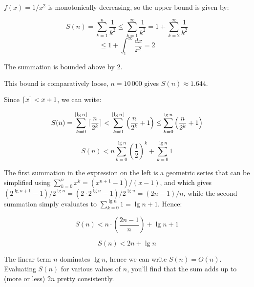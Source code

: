 \documentclass[a4paper,12pt]{article}
\DeclarePairedDelimiter\ceil{\lceil}{\rceil}
\DeclarePairedDelimiter\floor{\lfloor}{\rfloor}
\begin{document}

$f(x) = 1/x^2$ is monotonically decreasing, so the upper bound is given by:

\[ S(n) = \sum_{k=1}^n \frac{1}{k^2} \le \sum_{k=1}^\infty \frac{1}{k^2} = 1 + \sum_{k=2}^\infty \frac{1}{k^2} \]
\[ \le 1 + \int_1^\infty \frac{dx}{x^2} = 2 \]

The summation is bounded above by 2.

\vspace{2mm}
This bound is comparatively loose, $n=10\,000$ gives $S(n) \approx 1.644$.

\vspace{5mm}

Since $\ceil{x} < x + 1$, we can write:

\[ S(n) = \sum_{k=0}^{\floor{\lg n}} \ceil{\frac{n}{2^k}} < \sum_{k=0}^{\floor{\lg n}}\left( \frac{n}{2^k} + 1\right) \le   \sum_{k=0}^{\lg n}\left( \frac{n}{2^k} + 1\right) \]

\[ S(n) < n \sum_{k=0}^{\lg n}\left( \frac{1}{2} \right)^k+ \sum_{k=0}^{\lg n} 1 \]

The first summation in the expression on the left is a geometric series that can be simplified using $\sum_{k=0}^n x^k = (x^{n+1}-1)/(x-1)$, and which gives $(2^{\lg n+1}-1)/2^{\lg n} = (2 \cdot 2^{\lg n} -1)/2^{\lg n} = (2n-1)/n$, while the second summation simply evaluates to $\sum_{k=0}^{\lg n} 1 = \lg n + 1$. Hence:

\[ S(n) < n \cdot \left( \frac{2n-1}{n} \right) + \lg n + 1\]

\[ S(n) < 2n + \lg n \]

The linear term $n$ dominates $\lg n$, hence we can write $S(n) = O(n)$. Evaluating $S(n)$ for various values of $n$, you'll find that the sum adds up to (more or less) $2n$ pretty consistently.
\end{document}

